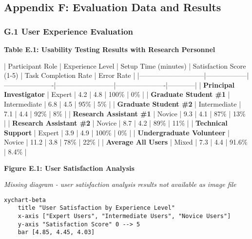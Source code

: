 \documentclass[11pt,a4paper]{article}
\begin{document}
\subsection{Appendix F: Evaluation Data and Results}

\subsubsection{G.1 User Experience Evaluation}

\textbf{Table E.1: Usability Testing Results with Research Personnel}

| Participant Role            | Experience Level | Setup Time (minutes) | Satisfaction Score (1-5) | Task Completion Rate | Error Rate |
|-----------------------------|------------------|----------------------|--------------------------|----------------------|------------|
| \textbf{Principal Investigator}  | Expert           | 4.2                  | 4.8                      | 100\%                 | 0\%         |
| \textbf{Graduate Student \#1}     | Intermediate     | 6.8                  | 4.5                      | 95\%                  | 5\%         |
| \textbf{Graduate Student \#2}     | Intermediate     | 7.1                  | 4.4                      | 92\%                  | 8\%         |
| \textbf{Research Assistant \#1}   | Novice           | 9.3                  | 4.1                      | 87\%                  | 13\%        |
| \textbf{Research Assistant \#2}   | Novice           | 8.7                  | 4.2                      | 89\%                  | 11\%        |
| \textbf{Technical Support}       | Expert           | 3.9                  | 4.9                      | 100\%                 | 0\%         |
| \textbf{Undergraduate Volunteer} | Novice           | 11.2                 | 3.8                      | 78\%                  | 22\%        |
| \textbf{Average All Users}       | Mixed            | 7.3                  | 4.4                      | 91.6\%                | 8.4\%       |

\textbf{Figure E.1: User Satisfaction Analysis}

\textit{Missing diagram - user satisfaction analysis results not available as image file}

\begin{verbatim}
xychart-beta
    title "User Satisfaction by Experience Level"
    x-axis ["Expert Users", "Intermediate Users", "Novice Users"]
    y-axis "Satisfaction Score" 0 --> 5
    bar [4.85, 4.45, 4.03]
\end{verbatim}
\end{document}
